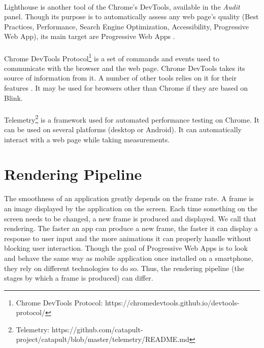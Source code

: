 \documentclass{kththesis}
\begin{document}
\paragraph{}
Lighthouse \cite{lighthouse} is another tool of the Chrome's DevTools, available in the \textit{Audit} panel. Though its purpose is to automatically assess any web page's quality (Best Practices, Performance, Search Engine Optimization, Accessibility, Progressive Web App), its main target are Progressive Web Apps \cite{PWApossibleUnifer}. 

\paragraph{}
Chrome DevTools Protocol\footnote{Chrome DevTools Protocol: https://chromedevtools.github.io/devtools-protocol/} is a set of commands and events used to communicate with the browser and the web page. Chrome DevTools takes its source of information from it. A number of other tools relies on it for their features \cite{awesome_CDP}. It may be used for browsers other than Chrome if they are based on Blink.

\paragraph{}
Telemetry\footnote{Telemetry: https://github.com/catapult-project/catapult/blob/master/telemetry/README.md} is a framework used for automated performance testing on Chrome. It can be used on several platforms (desktop or Android). It can automatically interact with a web page while taking measurements. 

\section{Rendering Pipeline}
\label{def:frame}

The smoothness of an application greatly depends on the frame rate. A frame is an image displayed by the application on the screen. Each time something on the screen needs to be changed, a new frame is produced and displayed. We call that rendering. The faster an app can produce a new frame, the faster it can display a response to user input and the more animations it can properly handle without blocking user interaction. \newline
Though the goal of Progressive Web Apps is to look and behave the same way as mobile application once installed on a smartphone, they rely on different technologies to do so. Thus, the rendering pipeline (the stages by which a frame is produced) can differ.
\end{document}
